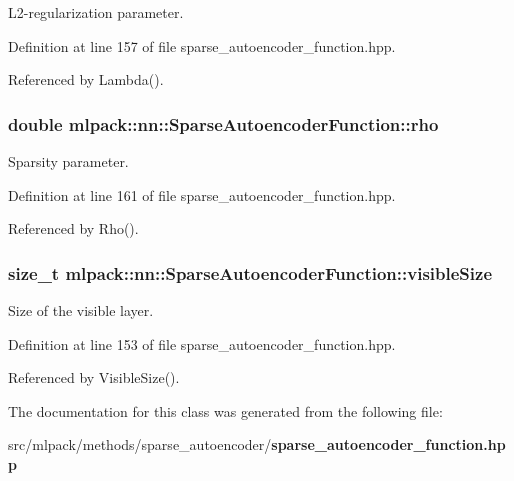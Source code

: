 L2-\/regularization parameter. 



Definition at line 157 of file sparse\+\_\+autoencoder\+\_\+function.\+hpp.



Referenced by Lambda().

\subsubsection[{rho}]{\setlength{\rightskip}{0pt plus 5cm}double mlpack\+::nn\+::\+Sparse\+Autoencoder\+Function\+::rho\hspace{0.3cm}{\ttfamily [private]}}\label{classmlpack_1_1nn_1_1SparseAutoencoderFunction_a9afee0f01482da62e7fb812103e809d0}


Sparsity parameter. 



Definition at line 161 of file sparse\+\_\+autoencoder\+\_\+function.\+hpp.



Referenced by Rho().

\subsubsection[{visible\+Size}]{\setlength{\rightskip}{0pt plus 5cm}size\+\_\+t mlpack\+::nn\+::\+Sparse\+Autoencoder\+Function\+::visible\+Size\hspace{0.3cm}{\ttfamily [private]}}\label{classmlpack_1_1nn_1_1SparseAutoencoderFunction_a7cc85a163755fcdd9f7ab105ce5ee1a7}


Size of the visible layer. 



Definition at line 153 of file sparse\+\_\+autoencoder\+\_\+function.\+hpp.



Referenced by Visible\+Size().



The documentation for this class was generated from the following file\+:\begin{DoxyCompactItemize}
\item 
src/mlpack/methods/sparse\+\_\+autoencoder/{\bf sparse\+\_\+autoencoder\+\_\+function.\+hpp}\end{DoxyCompactItemize}
